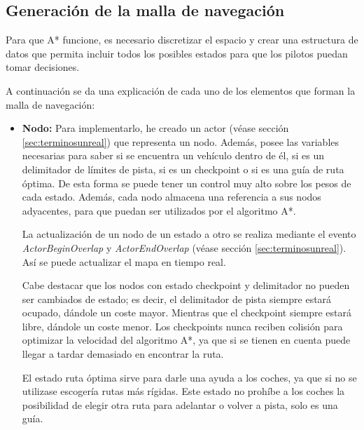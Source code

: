 \subsection{Generación de la malla de navegación}
Para que A* funcione, es necesario discretizar el espacio y crear una estructura de datos que permita incluir todos los posibles estados para que los pilotos puedan tomar decisiones.

\bigskip

A continuación se da una explicación de cada uno de los elementos que forman la malla de navegación:

\begin{itemize}
    \item \textbf{Nodo: }Para implementarlo, he creado un actor (véase sección \ref{sec:terminosunreal}) que representa un nodo. Además, posee las variables necesarias para saber si se encuentra un vehículo dentro de él, si es un delimitador de límites de pista, si es un checkpoint o si es una guía de ruta óptima. De esta forma se puede tener un control muy alto sobre los pesos de cada estado. Además, cada nodo almacena una referencia a sus nodos adyacentes, para que puedan ser utilizados por el algoritmo A*.
    
    \bigskip
    
    La actualización de un nodo de un estado a otro se realiza mediante el evento \textit{ActorBeginOverlap} y \textit{ActorEndOverlap} (véase sección \ref{sec:terminosunreal}). Así se puede actualizar el mapa en tiempo real.
    
    \bigskip
    
    Cabe destacar que los nodos con estado checkpoint y delimitador no pueden ser cambiados de estado; es decir, el delimitador de pista siempre estará ocupado, dándole un coste mayor. Mientras que el checkpoint siempre estará libre, dándole un coste menor. Los checkpoints nunca reciben colisión para optimizar la velocidad del algoritmo A*, ya que si se tienen en cuenta puede llegar a tardar demasiado en encontrar la ruta.
    
    \bigskip
    
    El estado ruta óptima sirve para darle una ayuda a los coches, ya que si no se utilizase escogería rutas más rígidas. Este estado no prohíbe a los coches la posibilidad de elegir otra ruta para adelantar o volver a pista, solo es una guía.
    
    \bigskip
    

\end{itemize}
